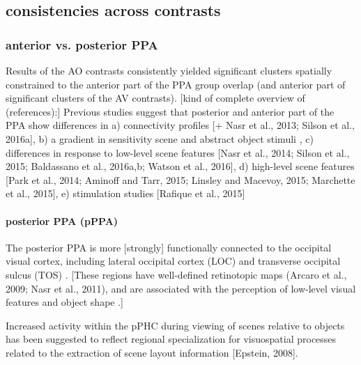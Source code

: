 \documentclass[english]{article}
\begin{document}
\subsection{consistencies across contrasts}


\subsubsection{anterior vs. posterior PPA}

Results of the AO contrasts consistently yielded significant clusters
spatially constrained to the anterior part of the PPA group overlap (and
anterior part of significant clusters of the AV contrasts).
[kind of complete overview of (references):] Previous studies suggest that
posterior and anterior part of the PPA show differences in
a) connectivity profiles \citep{baldassano2013differential, baldassano2016two}[+
Nasr et al., 2013; Silson et al., 2016a],
b) a gradient in sensitivity scene and abstract object stimuli
\citep{arcaro2009retinotopic, aminoff2007parahippocampal,
baldassano2013differential},
c) differences in response to low-level scene features [Nasr et al., 2014;
Silson et al., 2015; Baldassano et al., 2016a,b; Watson et al., 2016],
d) high-level scene features [Park et al., 2014; Aminoff and Tarr, 2015; Linsley
and Macevoy, 2015; Marchette et al., 2015],
e) stimulation studies [Rafique et al., 2015] \citep{baldassano2016two}



\paragraph{posterior PPA (pPPA)}

The posterior PPA is more [strongly] functionally connected to the occipital
visual cortex, including lateral occipital cortex (LOC) and transverse occipital
sulcus (TOS) \citep{baldassano2013differential, baldassano2016two}.
[These regions have well-defined retinotopic maps (Arcaro et al., 2009; Nasr et
al., 2011), and are associated with the perception of low-level visual features
and object shape \citep{baldassano2013differential}.]

%
Increased activity within the pPHC during viewing of scenes relative to objects
has been suggested to reflect regional specialization for visuospatial processes
related to the extraction of scene layout information [Epstein,
2008]\citep{baumann2016functional}.
\end{document}
